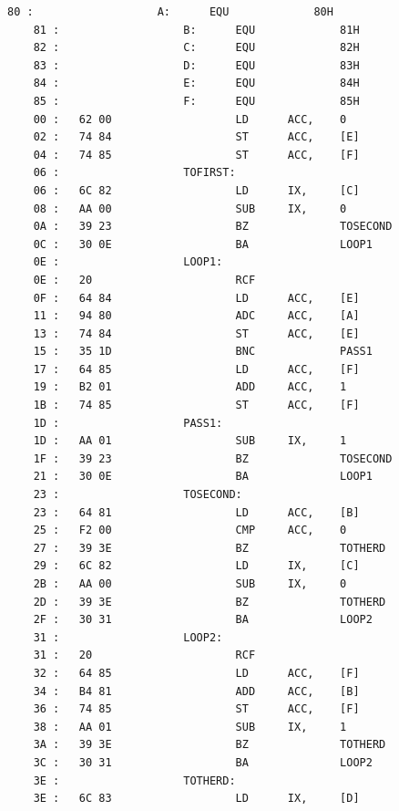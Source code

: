 \documentclass[dvipdfmx]{jsarticle}
\begin{document}
\begin{lstlisting}[caption=乗算を行うプログラムリスト, label=program]
    80 :                   A:      EQU             80H
    81 :                   B:      EQU             81H
    82 :                   C:      EQU             82H
    83 :                   D:      EQU             83H
    84 :                   E:      EQU             84H
    85 :                   F:      EQU             85H
    00 :   62 00                   LD      ACC,    0
    02 :   74 84                   ST      ACC,    [E]
    04 :   74 85                   ST      ACC,    [F]
    06 :                   TOFIRST:                        
    06 :   6C 82                   LD      IX,     [C]
    08 :   AA 00                   SUB     IX,     0
    0A :   39 23                   BZ              TOSECOND
    0C :   30 0E                   BA              LOOP1
    0E :                   LOOP1:                  
    0E :   20                      RCF             
    0F :   64 84                   LD      ACC,    [E]
    11 :   94 80                   ADC     ACC,    [A]
    13 :   74 84                   ST      ACC,    [E]
    15 :   35 1D                   BNC             PASS1
    17 :   64 85                   LD      ACC,    [F]
    19 :   B2 01                   ADD     ACC,    1
    1B :   74 85                   ST      ACC,    [F]
    1D :                   PASS1:                  
    1D :   AA 01                   SUB     IX,     1
    1F :   39 23                   BZ              TOSECOND
    21 :   30 0E                   BA              LOOP1
    23 :                   TOSECOND:                       
    23 :   64 81                   LD      ACC,    [B]
    25 :   F2 00                   CMP     ACC,    0
    27 :   39 3E                   BZ              TOTHERD
    29 :   6C 82                   LD      IX,     [C]
    2B :   AA 00                   SUB     IX,     0
    2D :   39 3E                   BZ              TOTHERD
    2F :   30 31                   BA              LOOP2
    31 :                   LOOP2:                  
    31 :   20                      RCF             
    32 :   64 85                   LD      ACC,    [F]
    34 :   B4 81                   ADD     ACC,    [B]
    36 :   74 85                   ST      ACC,    [F]
    38 :   AA 01                   SUB     IX,     1
    3A :   39 3E                   BZ              TOTHERD
    3C :   30 31                   BA              LOOP2
    3E :                   TOTHERD:                        
    3E :   6C 83                   LD      IX,     [D]

\end{lstlisting}
\end{document}
